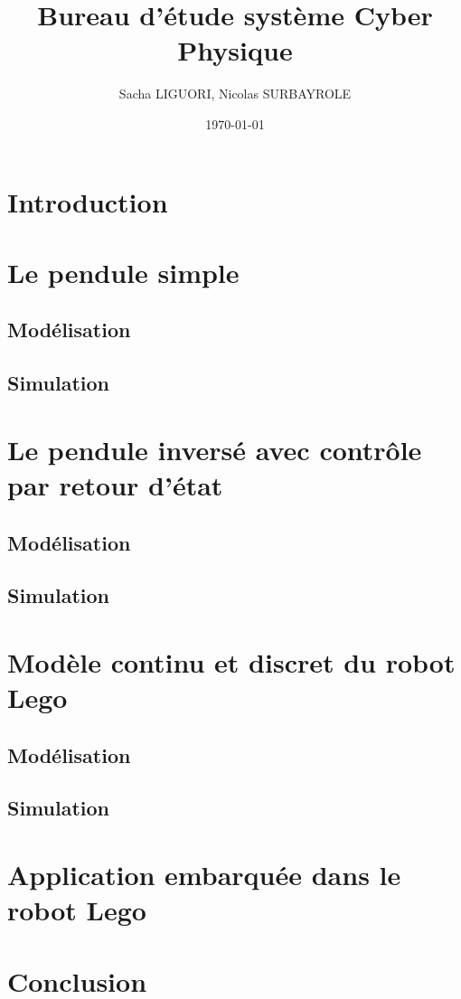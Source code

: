 \documentclass[11pt]{article}
\author{Sacha LIGUORI, Nicolas SURBAYROLE}
\title{Bureau d'étude système Cyber Physique}
\date{\today}
\begin{document}
\maketitle

\tableofcontents

\newpage

\section*{Introduction}

\section{Le pendule simple}
\subsection{Modélisation}
\subsection{Simulation}

\section{Le pendule inversé avec contrôle par retour d'état}
\subsection{Modélisation}
\subsection{Simulation}

\section{Modèle continu et discret du robot Lego}
\subsection{Modélisation}
\subsection{Simulation}

\section{Application embarquée dans le robot Lego}

\section*{Conclusion}
\end{document}
